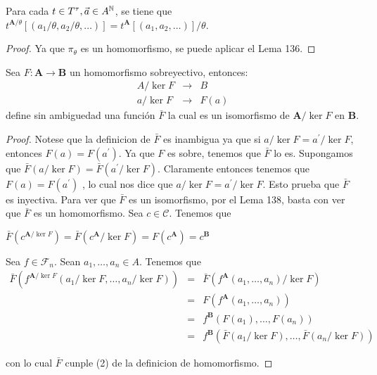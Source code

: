   \begin{corollary} \label{corollary_54}
    \PN Para cada $t \in T^{\tau}, \vec{a} \in A^{\mathbb{N}}$, se tiene que $t^{\mathbf{A}/\theta}[(a_{1}/\theta,
    a_{2}/\theta, \dotsc)] = t^{\mathbf{A}}[(a_{1}, a_{2}, \dotsc)]/\theta$.
  \end{corollary}
  \begin{proof}
    Ya que $\pi _{\theta }$ es un homomorfismo, se puede aplicar el Lema 136.
  \end{proof}

  \begin{theorem} \label{theorem_55}
    \PN Sea $F: \mathbf{A} \rightarrow \mathbf{B}$ un homomorfismo sobreyectivo, entonces:
    \begin{eqnarray*}
      A/\ker F &\rightarrow& B \\
      a/\ker F &\rightarrow& F(a)
    \end{eqnarray*}
    \PN define sin ambiguedad una función $\bar{F}$ la cual es un isomorfismo de $\mathbf{A}/\ker F$ en $\mathbf{B}$.
  \end{theorem}
  \begin{proof}
    Notese que la definicion de $\bar{F}$ es inambigua ya que si $a/\ker F=a^{\prime }/\ker F$, entonces $F(a)=F(a^{\prime }).$ Ya que $F$ es sobre, tenemos que $\bar{F}$ lo es. Supongamos que $\bar{F}(a/\ker F)=\bar{F} (a^{\prime }/\ker F).$ Claramente entonces tenemos que $F(a)=F(a^{\prime })$ , lo cual nos dice que $a/\ker F=a^{\prime }/\ker F$. Esto prueba que $\bar{F }$ es inyectiva. Para ver que $\bar{F}$ es un isomorfismo, por el Lema 138, basta con ver que $\bar{F}$ es un homomorfismo. Sea $c\in \mathcal{C}$. Tenemos que

    $\displaystyle \bar{F}(c^{\mathbf{A}/\ker F})=\bar{F}(c^{\mathbf{A}}/\ker F)=F(c^{\mathbf{A} })=c^{\mathbf{B}} $

    Sea $f\in \mathcal{F}_{n}$. Sean $a_{1}, \dotsc, a_{n}\in A$. Tenemos que
    \[
      \begin{array}{ccl}
        \bar{F}(f^{\mathbf{A}/\ker F}(a_{1}/\ker F, \dotsc, a_{n}/\ker F)) &=& \bar{F}(f^{\mathbf{A}}(a_{1}, \dotsc,
          a_{n})/\ker F) \\
        &=& F(f^{\mathbf{A}}(a_{1}, \dotsc, a_{n})) \\
        &=& f^{\mathbf{B}}(F(a_{1}), \dotsc, F(a_{n})) \\
        &=& f^{\mathbf{B}}(\bar{F}(a_{1}/\ker F), \dotsc, \bar{F}(a_{n}/\ker F))
      \end{array}
    \]

    con lo cual $\bar{F}$ cunple (2) de la definicion de homomorfismo.
  \end{proof}


